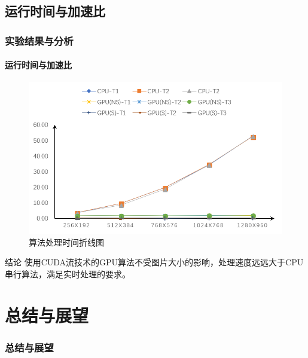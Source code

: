 \documentclass[aspectratio=43, xcolor=svgnames, t, 10pt]{beamer}
\begin{document}
\subsection{运行时间与加速比}
\begin{frame}
  \frametitle{实验结果与分析}
  \framesubtitle{运行时间与加速比}
    \begin{figure}
      \includegraphics[scale=0.5]{./figure/run_time-02.png}
      \caption{算法处理时间折线图}
    \end{figure}
    \begin{block}{结论}
      使用CUDA流技术的GPU算法不受图片大小的影响，处理速度远远大于CPU串行算法，满足实时处理的要求。
    \end{block}
\end{frame}

\section{总结与展望}
\begin{frame}
  \frametitle{总结与展望}
  \framesubtitle{}
\end{frame}

{\nwsuafwavesbg
  \begin{frame}
  \end{frame}}
\end{document}
